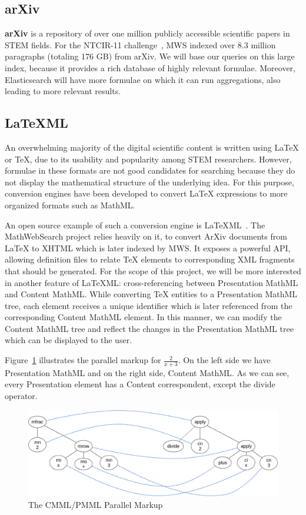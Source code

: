 \documentclass[a4paper,oneside]{article}
\def\MWS{\textsf{MWS}\xspace}
\def\mws{\textsf{MathWebSearch}\xspace}
\def\cmml{\textsf{Content MathML}\xspace}
\def\pmml{\textsf{Presentation MathML}\xspace}
\def\arxiv{\textsf{ArXiv}\xspace}
\def\latexml{\LaTeX{ML}\xspace}
\def\mathml{\textsf{MathML}\xspace}
\def\latex{\LaTeX\xspace}
\def\tex{\TeX\xspace}
\begin{document}
\subsection{arXiv}\label{subsec:arxiv}
\textbf{arXiv} is a repository of over one million publicly accessible
scientific papers in STEM fields. For the NTCIR-11
challenge~\cite{HamKohPro:man14},
MWS indexed over 8.3 million paragraphs (totaling 176 GB) from arXiv. We will
base our queries on this large index, because it provides a rich database of
highly relevant formulae. Moreover, Elasticsearch will have more formulae on
which it can run aggregations, also leading to more relevant results.

\subsection{\latexml}\label{subsec:latexml}
An overwhelming majority of the digital scientific content is written using
\latex or \tex, due to its usability and popularity among STEM researchers.
However, formulae in these formats are not good candidates for searching
because they do not display the mathematical structure of the underlying
idea. For this purpose, conversion engines have been developed to convert
\latex expressions to more organized formats such as \mathml.

An open source example of such a conversion engine is
\latexml~\cite{Miller:latexml:online}. The \mws project relies heavily on it,
to convert \arxiv documents from \latex to XHTML which is later indexed by \MWS.
It exposes a powerful API, allowing definition files to relate \tex elements to
corresponding XML fragments that should be generated.
For the scope of this project, we will be more interested in another feature of
\latexml: cross-referencing between \pmml and \cmml. While converting \tex
entities to a \pmml tree, each element receives a unique identifier which is
later referenced from the corresponding \cmml element. In this manner, we can
modify the \cmml tree and reflect the changes in the \pmml tree which can be
displayed to the user.

Figure~\ref{fig:crossreference_diag} illustrates the parallel markup for
$\frac{2}{x+3}$. On the left side we have \pmml and on the right side, \cmml.
As we can see, every Presentation element has a Content correspondent, except
the \textsf{divide} operator.

\begin{figure}[ht]\centering
    \includegraphics[scale=0.3]{img/crossreference_diag.png}
    \caption{The CMML/PMML Parallel Markup}\label{fig:crossreference_diag}
\end{figure}
\FloatBarrier
\end{document}
